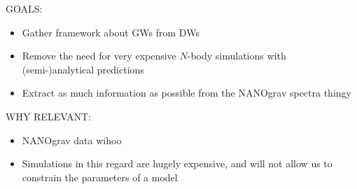 


\begin{bullets}
    \item GOALS: \begin{itemize}
        \item Gather framework about GWs from DWs
        \item Remove the need for very expensive $N$-body simulations with (semi-)analytical predictions
        \item Extract as much information as possible from the NANOgrav spectra thingy
    \end{itemize}
    \item WHY RELEVANT: \begin{itemize}
        \item NANOgrav data wihoo
        \item Simulations in this regard are hugely expensive, and will not allow us to constrain the parameters of a model
    \end{itemize}
\end{bullets}



















